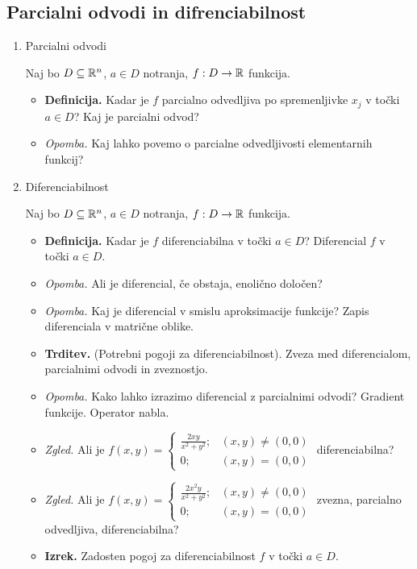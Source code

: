 \subsection{Parcialni odvodi in difrenciabilnost}
\begin{enumerate}
    \item Parcialni odvodi
    
    Naj bo $D \subseteq \mathbb{R}^n$, $a \in D$ notranja, $f: D \to \mathbb{R}$ funkcija.
    
    \begin{itemize}
        \item \colorbox{purple!30}{\textbf{Definicija.}} Kadar je $f$ parcialno odvedljiva po spremenljivke $x_j$ v točki $a \in D$? Kaj je parcialni odvod?
        \item \colorbox{yellow!30}{\emph{Opomba.}} Kaj lahko povemo o parcialne odvedljivosti elementarnih funkcij?
    \end{itemize}

    \item Diferenciabilnost
    
    Naj bo $D \subseteq \mathbb{R}^n$, $a \in D$ notranja, $f: D \to \mathbb{R}$ funkcija.
    
    \begin{itemize}
        \item \colorbox{purple!30}{\textbf{Definicija.}} Kadar je $f$ diferenciabilna v točki $a \in D$? Diferencial $f$ v točki $a \in D$.
        \item \colorbox{yellow!30}{\emph{Opomba.}} Ali je diferencial, če obstaja, enolično določen?
        \item \colorbox{yellow!30}{\emph{Opomba.}} Kaj je diferencial v smislu aproksimacije funkcije? Zapis diferenciala v matrične oblike.
        \item \colorbox{blue!30}{\textbf{Trditev.}} (Potrebni pogoji za diferenciabilnost). Zveza med diferencialom, parcialnimi odvodi in zveznostjo.
        \item \colorbox{yellow!30}{\emph{Opomba.}} Kako lahko izrazimo diferencial z parcialnimi odvodi? Gradient funkcije. Operator nabla.
        \item \colorbox{yellow!30}{\emph{Zgled.}} Ali je $f(x, y) = \begin{cases}
            \frac{2xy}{x^2+y^2}; &(x, y) \neq (0,0) \\ 0; &(x, y) = (0,0)
        \end{cases}$ diferenciabilna?
        \item \colorbox{yellow!30}{\emph{Zgled.}} Ali je $f(x, y) = \begin{cases}
            \frac{2x^2y}{x^2+y^2}; &(x, y) \neq (0,0) \\ 0; &(x, y) = (0,0)
        \end{cases}$ zvezna, parcialno odvedljiva, diferenciabilna?
        \item \colorbox{blue!30}{\textbf{Izrek.}} Zadosten pogoj za diferenciabilnost $f$ v točki $a \in D$. \todo{*}
    \end{itemize}


\end{enumerate}
